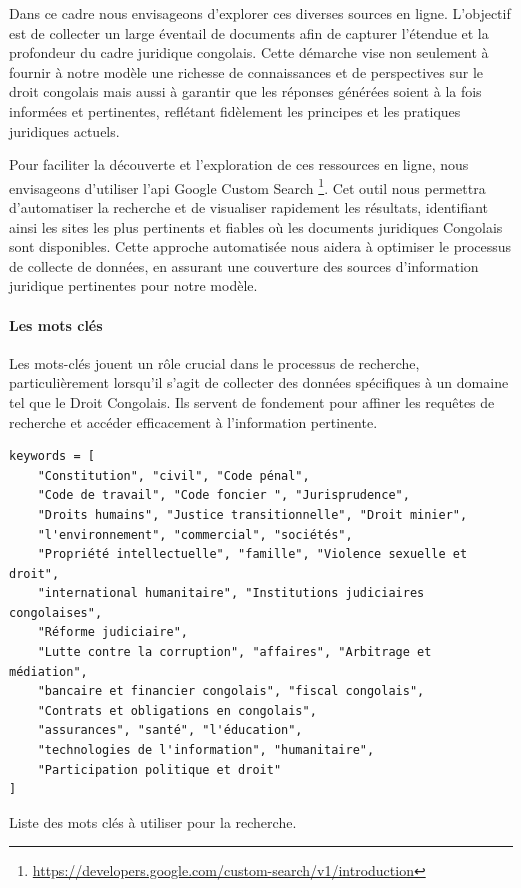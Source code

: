 Dans ce cadre nous envisageons d'explorer ces diverses sources en ligne. L'objectif est de collecter un large éventail de documents afin de capturer l'étendue et la profondeur du cadre juridique congolais. Cette démarche vise non seulement à fournir à notre modèle une richesse de connaissances et de perspectives sur le droit congolais mais aussi à garantir que les réponses générées soient à la fois informées et pertinentes, reflétant fidèlement les principes et les pratiques juridiques actuels.

Pour faciliter la découverte et l'exploration de ces ressources en ligne, nous envisageons d'utiliser l'\acs{api} Google Custom Search \footnote{\href{https://developers.google.com/custom-search/v1/introduction}{https://developers.google.com/custom-search/v1/introduction}}. Cet outil nous permettra d'automatiser la recherche et de visualiser rapidement les résultats, identifiant ainsi les sites les plus pertinents et fiables où les documents juridiques Congolais sont disponibles. Cette approche automatisée nous aidera à optimiser le processus de collecte de données, en assurant une couverture des sources d'information juridique pertinentes pour notre modèle.

\newpage
\paragraph{Les mots clés} \hspace{0pt}

Les mots-clés jouent un rôle crucial dans le processus de recherche, particulièrement lorsqu'il s'agit de collecter des données spécifiques à un domaine tel que le Droit Congolais. Ils servent de fondement pour affiner les requêtes de recherche et accéder efficacement à l'information pertinente.

\begin{listing}[!ht]
\begin{verbatim}
keywords = [
    "Constitution", "civil", "Code pénal",
    "Code de travail", "Code foncier ", "Jurisprudence",
    "Droits humains", "Justice transitionnelle", "Droit minier",
    "l'environnement", "commercial", "sociétés",
    "Propriété intellectuelle", "famille", "Violence sexuelle et droit",
    "international humanitaire", "Institutions judiciaires congolaises", 
    "Réforme judiciaire",
    "Lutte contre la corruption", "affaires", "Arbitrage et médiation",
    "bancaire et financier congolais", "fiscal congolais", 
    "Contrats et obligations en congolais",
    "assurances", "santé", "l'éducation",
    "technologies de l'information", "humanitaire",
    "Participation politique et droit"
]
\end{verbatim}
\caption{Liste des mots clés à utiliser pour la recherche.}
\label{appendix:code:python:search-keywords}
\end{listing}

